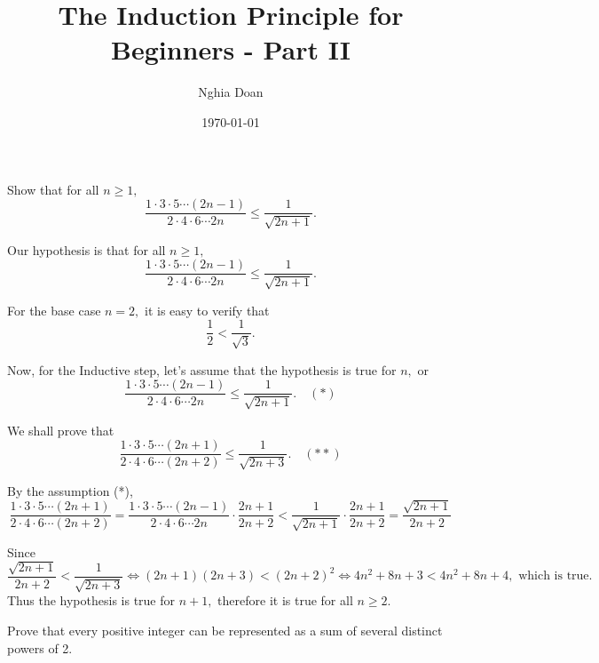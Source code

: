\documentclass{article}
\title{The Induction Principle for Beginners - Part II}
\author{Nghia Doan}
\date{\today}
\begin{document}
\maketitle

\begin{example}
    Show that for all $n \ge 1,$
    \[
        \frac{1 \cdot 3 \cdot 5 \cdots (2n-1)}{2 \cdot 4 \cdot 6 \cdots 2n} \le \frac{1}{\sqrt{2n+1}}.
    \]
\end{example}

\begin{soln}
    Our hypothesis is that for all $n \ge 1,$
    \[
        \frac{1 \cdot 3 \cdot 5 \cdots (2n-1)}{2 \cdot 4 \cdot 6 \cdots 2n} \le \frac{1}{\sqrt{2n+1}}.
    \]

    For the base case $n=2,$ it is easy to verify that
    \[
        \frac{1}{2} < \frac{1}{\sqrt{3}}.
    \]
    
    Now, for the Inductive step, let's assume that the hypothesis is true for $n,$ or
    \[
        \frac{1 \cdot 3 \cdot 5 \cdots (2n-1)}{2 \cdot 4 \cdot 6 \cdots 2n} \le \frac{1}{\sqrt{2n+1}}. \quad (*)
    \]

    We shall prove that
    \[
        \frac{1 \cdot 3 \cdot 5 \cdots (2n+1)}{2 \cdot 4 \cdot 6 \cdots (2n+2)} \le \frac{1}{\sqrt{2n+3}}. \quad (**)
    \]

    By the assumption (*),
    \[
        \frac{1 \cdot 3 \cdot 5 \cdots (2n+1)}{2 \cdot 4 \cdot 6 \cdots (2n+2)}
        = \frac{1 \cdot 3 \cdot 5 \cdots (2n-1)}{2 \cdot 4 \cdot 6 \cdots 2n} \cdot \frac{2n+1}{2n+2} 
        < \frac{1}{\sqrt{2n+1}} \cdot \frac{2n+1}{2n+2} 
        = \frac{\sqrt{2n+1}}{2n+2}
    \]
    
    Since 
    \[
        \frac{\sqrt{2n+1}}{2n+2} < \frac{1}{\sqrt{2n+3}}
        \Leftrightarrow (2n+1)(2n+3) < (2n+2)^2
        \Leftrightarrow 4n^2 + 8n + 3 < 4n^2+ 8n + 4, \text{\ which is true.}
    \]
    Thus the hypothesis is true for $n+1,$ therefore it is true for all $n \ge 2.$
\end{soln}

\newpage

\begin{example}
    Prove that every positive integer can be represented as a sum of several distinct powers of 2.
\end{example}
\end{document}
